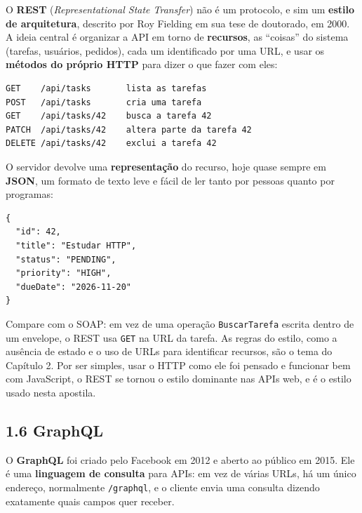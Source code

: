 O \textbf{REST} (\textit{Representational State Transfer}) não é um protocolo, e sim um \textbf{estilo de arquitetura}, descrito por Roy Fielding em sua tese de doutorado, em 2000. A ideia central é organizar a API em torno de \textbf{recursos}, as ``coisas'' do sistema (tarefas, usuários, pedidos), cada um identificado por uma URL, e usar os \textbf{métodos do próprio HTTP} para dizer o que fazer com eles:

\begin{codigo}
\begin{Verbatim}[breaklines=true, breaksymbolleft={}, fontsize=\footnotesize]
GET    /api/tasks       lista as tarefas
POST   /api/tasks       cria uma tarefa
GET    /api/tasks/42    busca a tarefa 42
PATCH  /api/tasks/42    altera parte da tarefa 42
DELETE /api/tasks/42    exclui a tarefa 42
\end{Verbatim}
\end{codigo}

O servidor devolve uma \textbf{representação} do recurso, hoje quase sempre em \textbf{JSON}, um formato de texto leve e fácil de ler tanto por pessoas quanto por programas:

\begin{codigo}
\begin{Verbatim}[breaklines=true, breaksymbolleft={}, fontsize=\footnotesize]
{
  "id": 42,
  "title": "Estudar HTTP",
  "status": "PENDING",
  "priority": "HIGH",
  "dueDate": "2026-11-20"
}
\end{Verbatim}
\end{codigo}

Compare com o SOAP: em vez de uma operação \texttt{BuscarTarefa} escrita dentro de um envelope, o REST usa \texttt{GET} na URL da tarefa. As regras do estilo, como a ausência de estado e o uso de URLs para identificar recursos, são o tema do Capítulo 2. Por ser simples, usar o HTTP como ele foi pensado e funcionar bem com JavaScript, o REST se tornou o estilo dominante nas APIs web, e é o estilo usado nesta apostila.

\subsection{1.6 GraphQL}

O \textbf{GraphQL} foi criado pelo Facebook em 2012 e aberto ao público em 2015. Ele é uma \textbf{linguagem de consulta} para APIs: em vez de várias URLs, há um único endereço, normalmente \texttt{/graphql}, e o cliente envia uma consulta dizendo exatamente quais campos quer receber.

